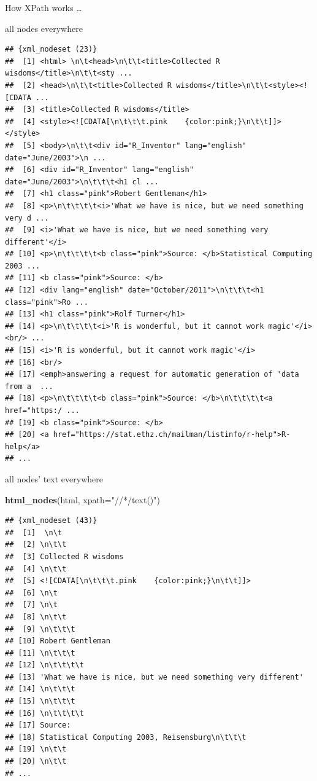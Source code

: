 \documentclass[ignorenonframetext,]{beamer}
\newenvironment{Shaded}{\begin{snugshade}}{\end{snugshade}}
\newcommand{\KeywordTok}[1]{\textcolor[rgb]{0.13,0.29,0.53}{\textbf{{#1}}}}
\newcommand{\DataTypeTok}[1]{\textcolor[rgb]{0.13,0.29,0.53}{{#1}}}
\newcommand{\StringTok}[1]{\textcolor[rgb]{0.31,0.60,0.02}{{#1}}}
\newcommand{\NormalTok}[1]{{#1}}
\begin{document}
\begin{frame}[fragile]{How XPath works \ldots{}}
\begin{block}{all nodes everywhere}
\begin{verbatim}
## {xml_nodeset (23)}
##  [1] <html> \n\t<head>\n\t\t<title>Collected R wisdoms</title>\n\t\t<sty ...
##  [2] <head>\n\t\t<title>Collected R wisdoms</title>\n\t\t<style><![CDATA ...
##  [3] <title>Collected R wisdoms</title>
##  [4] <style><![CDATA[\n\t\t\t.pink    {color:pink;}\n\t\t]]></style>
##  [5] <body>\n\t\t<div id="R_Inventor" lang="english" date="June/2003">\n ...
##  [6] <div id="R_Inventor" lang="english" date="June/2003">\n\t\t\t<h1 cl ...
##  [7] <h1 class="pink">Robert Gentleman</h1>
##  [8] <p>\n\t\t\t\t<i>'What we have is nice, but we need something very d ...
##  [9] <i>'What we have is nice, but we need something very different'</i>
## [10] <p>\n\t\t\t\t<b class="pink">Source: </b>Statistical Computing 2003 ...
## [11] <b class="pink">Source: </b>
## [12] <div lang="english" date="October/2011">\n\t\t\t<h1 class="pink">Ro ...
## [13] <h1 class="pink">Rolf Turner</h1>
## [14] <p>\n\t\t\t\t<i>'R is wonderful, but it cannot work magic'</i><br/> ...
## [15] <i>'R is wonderful, but it cannot work magic'</i>
## [16] <br/>
## [17] <emph>answering a request for automatic generation of 'data from a  ...
## [18] <p>\n\t\t\t\t<b class="pink">Source: </b>\n\t\t\t\t<a href="https:/ ...
## [19] <b class="pink">Source: </b>
## [20] <a href="https://stat.ethz.ch/mailman/listinfo/r-help">R-help</a>
## ...
\end{verbatim}

\end{block}

\begin{block}{all nodes' text everywhere}

\begin{Shaded}
\begin{Highlighting}[]
\KeywordTok{html_nodes}\NormalTok{(html, }\DataTypeTok{xpath=}\StringTok{"//*/text()"}\NormalTok{)}
\end{Highlighting}
\end{Shaded}

\begin{verbatim}
## {xml_nodeset (43)}
##  [1]  \n\t
##  [2] \n\t\t
##  [3] Collected R wisdoms
##  [4] \n\t\t
##  [5] <![CDATA[\n\t\t\t.pink    {color:pink;}\n\t\t]]>
##  [6] \n\t
##  [7] \n\t
##  [8] \n\t\t
##  [9] \n\t\t\t
## [10] Robert Gentleman
## [11] \n\t\t\t
## [12] \n\t\t\t\t
## [13] 'What we have is nice, but we need something very different'
## [14] \n\t\t\t
## [15] \n\t\t\t
## [16] \n\t\t\t\t
## [17] Source: 
## [18] Statistical Computing 2003, Reisensburg\n\t\t\t
## [19] \n\t\t
## [20] \n\t\t
## ...
\end{verbatim}


\end{block}
\end{frame}
\end{document}
